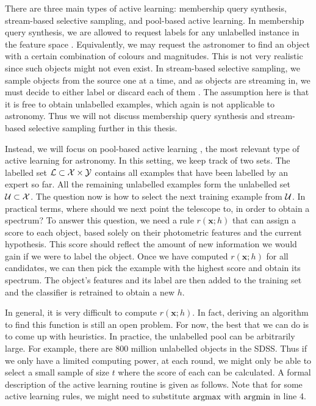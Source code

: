 There are three main types of active learning: membership query synthesis, stream-based selective
sampling, and pool-based active learning. In membership query synthesis, we are allowed to request
labels for any unlabelled instance in the feature space \cite{angluin88}. Equivalently, we may
request the astronomer to find an object with a certain combination of colours and magnitudes. This
is not very realistic since such objects might not even exist. In stream-based selective sampling,
we sample objects from the source one at a time, and as objects are streaming in, we must decide to
either label or discard each of them \cite{cohn94}. The assumption here is that it is free to obtain
unlabelled examples, which again is not applicable to astronomy. Thus we will not discuss membership
query synthesis and stream-based selective sampling further in this thesis.

Instead, we will focus on pool-based active learning \cite{lewis94}, the most relevant type of
active learning for astronomy. In this setting, we keep track of two sets. The labelled set
$\mathcal{L} \subset \mathcal{X} \times \mathcal{Y}$ contains all examples that have been labelled by an expert so far.
All the remaining unlabelled examples form the unlabelled set $\mathcal{U} \subset \mathcal{X}$. The question
now is how to select the next training example from $\mathcal{U}$. In practical terms, where should
we next point the telescope to, in order to obtain a spectrum? To answer this question, we need a
rule $r(\bm{x}; h)$ that can assign a score to each object, based solely on their photometric
features and the current hypothesis. This score should reflect the amount of new information we
would gain if we were to label the object. Once we have computed $r(\bm{x}; h)$ for all candidates,
we can then pick the example with the highest score and obtain its spectrum. The object's features
and its label are then added to the training set and the classifier is retrained to obtain a new
$h$.

In general, it is very difficult to compute $r(\bm{x}; h)$. In fact, deriving an algorithm to find
this function is still an open problem. For now, the best that we can do is to come up with
heuristics. In practice, the unlabelled pool can be arbitrarily large. For example, there are 800
million unlabelled objects in the SDSS. Thus if we only have a limited computing power, at each
round, we might only be able to select a small sample of size $t$ where the score of each can be
calculated. A formal description of the active learning routine is given as follows. Note that for
some active learning rules, we might need to substitute $\argmax$ with $\argmin$ in line 4.

